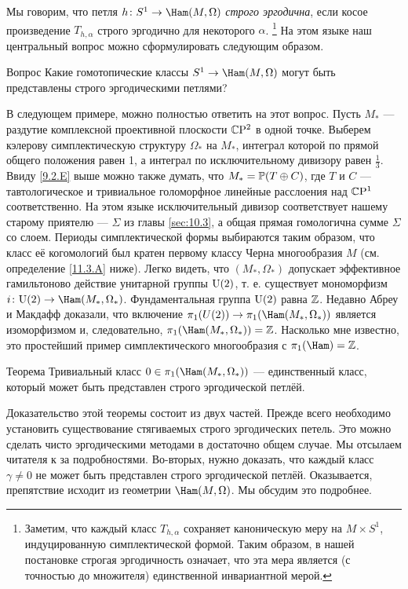 Мы говорим, что петля $h\:S^1\to\Ham(M,\Omega)$ \emph{строго эргодична}, если косое произведение $T_{h,\alpha}$ строго эргодично
для некоторого $\alpha$.%
\footnote{Заметим, что каждый класс $T_{h,\alpha}$ сохраняет
  каноническую меру на $M \times S^1$, индуцированную симплектической
  формой.
Таким образом, в нашей постановке строгая эргодичность означает, что
эта мера является (с точностью до множителя) единственной инвариантной
мерой.} 
На этом языке наш центральный вопрос можно сформулировать следующим образом.

\begin{ex*}{Вопрос}
Какие гомотопические классы $S^1 \to \Ham(M, \Omega)$ могут быть
представлены строго эргодическими петлями? 
\end{ex*}

В следующем примере, можно полностью ответить на этот вопрос.
Пусть $M_\ast$ --- раздутие комплексной проективной плоскости $\mathbb{C}\mathrm{P}^2$
в одной точке. 
Выберем кэлерову симплектическую структуру $\Omega_\ast$ на $M_\ast$,
интеграл которой по прямой общего положения равен 1, а интеграл по
исключительному дивизору равен $\tfrac13$. 
Ввиду \ref{9.2.E} выше можно также думать, что $M_\ast = \mathbb{P}(T \oplus
C)$, где $T$ и $C$ --- тавтологическое и тривиальное голоморфное
линейные расслоения над $\mathbb{C}\mathrm{P}^1$ соответственно. 
На этом языке исключительный дивизор соответствует нашему старому
приятелю --- $\Sigma$ из главы \ref{sec:10.3}, а общая прямая гомологична
сумме $\Sigma$ со слоем. 
Периоды симплектической формы выбираются таким образом, что класс её
когомологий был кратен первому классу Черна многообразия $M$
(см. определение \ref{11.3.A} ниже). 
Легко видеть, что $(M_\ast, \Omega_\ast)$ допускает эффективное
гамильтоново действие унитарной группы $\mathrm{U}(2)$, т. е. существует
мономорфизм $i\: \U(2) \to \Ham(M_\ast, \Omega_\ast)$. 
Фундаментальная группа $\mathrm{U}(2)$ равна $\mathbb{Z}$.
Недавно Абреу и Макдафф \cite{AM} доказали, что включение $\pi_1(U(2))
\to \pi_1 (\Ham(M_\ast, \Omega_\ast))$ является изоморфизмом и,
следовательно, $\pi_1(\Ham(M_\ast, \Omega_\ast)) = \ZZ$. 
Насколько мне известно, это простейший пример симплектического
многообразия с $\pi_1 (\Ham) = \ZZ$. 

\begin{thm}{Теорема}\label{11.1.A}
Тривиальный класс $0\in\pi_1(\Ham(M_\ast, \Omega_\ast))$ ---
единственный класс, который может быть представлен строго эргодической
петлёй. 
\end{thm}

Доказательство этой теоремы состоит из двух частей.
Прежде всего необходимо установить существование стягиваемых строго
эргодических петель. 
Это можно сделать чисто эргодическими методами в достаточно общем случае.
Мы отсылаем читателя к \cite{P9} за подробностями.
Во-вторых, нужно доказать, что каждый класс $\gamma \ne 0$ не может
быть представлен строго эргодической петлёй. 
Оказывается, препятствие исходит из геометрии $\Ham(M, \Omega)$.
Мы обсудим это подробнее.

